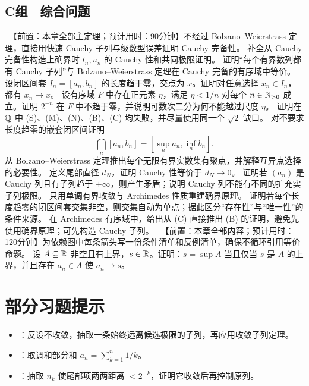 \subsection*{C组　综合问题}
\begin{enumerate}[label=\textbf{\thechapter.\arabic*.},resume]
  \ 【前置：本章全部主定理；预计用时：90分钟】不经过 Bolzano--Weierstrass 定理，直接用快速 Cauchy 子列与级数型误差证明 Cauchy 完备性。
  补全从 Cauchy 完备性构造上确界时 \(l_n,u_n\) 的 Cauchy 性和共同极限证明。
  证明“每个有界数列都有 Cauchy 子列”与 Bolzano--Weierstrass 定理在 Cauchy 完备的有序域中等价。
  设闭区间套 \(I_n=[a_n,b_n]\) 的长度趋于零，交点为 \(x\)。证明对任意选择 \(x_n\in I_n\)，都有 \(x_n\to x\)。
  设有序域 \(F\) 中存在正元素 \(\eta\)，满足 \(\eta<1/n\) 对每个 \(n\in\mathbb{N}_{>0}\) 成立。证明 \(2^{-n}\) 在 \(F\) 中不趋于零，并说明可数次二分为何不能越过尺度 \(\eta\)。
  证明在 \(\mathbb{Q}\) 中 (S)、(M)、(N)、(B)、(C) 均失败，并尽量使用同一个 \(\sqrt2\) 缺口。
  对不要求长度趋零的嵌套闭区间证明
 \[
  \bigcap_n[a_n,b_n]=[\sup_n a_n,\inf_n b_n].
 \]
  从 Bolzano--Weierstrass 定理推出每个无限有界实数集有聚点，并解释互异点选择的必要性。
  定义尾部直径 \(d_N\)，证明 Cauchy 性等价于 \(d_N\to0\)。
  证明若 \((a_n)\) 是 Cauchy 列且有子列趋于 \(+\infty\)，则产生矛盾；说明 Cauchy 列不能有不同的扩充实子列极限。
  只用单调有界收敛与 Archimedes 性质重建确界原理。
  证明若每个长度趋零的闭区间套交集非空，则交集自动为单点；据此区分“存在性”与“唯一性”的条件来源。
  在 Archimedes 有序域中，给出从 (C) 直接推出 (B) 的证明，避免先使用确界原理；可先构造 Cauchy 子列。
  \ 【前置：本章全部内容；预计用时：120分钟】为依赖图中每条箭头写一份条件清单和反例清单，确保不循环引用等价命题。
  设 \(A\subseteq\mathbb{R}\) 非空且有上界，\(s\in\mathbb{R}\)。证明：\(s=\sup A\) 当且仅当 \(s\) 是 \(A\) 的上界，并且存在 \(a_n\in A\) 使 \(a_n\to s\)。
\end{enumerate}

\section*{部分习题提示}
\begin{itemize}
 \item {}：反设不收敛，抽取一条始终远离候选极限的子列，再应用收敛子列定理。
 \item {}：取调和部分和 \(a_n=\sum_{k=1}^n1/k\)。
 \item {}：抽取 \(n_k\) 使尾部项两两距离 \(<2^{-k}\)，证明它收敛后再控制原列。
\end{itemize}
